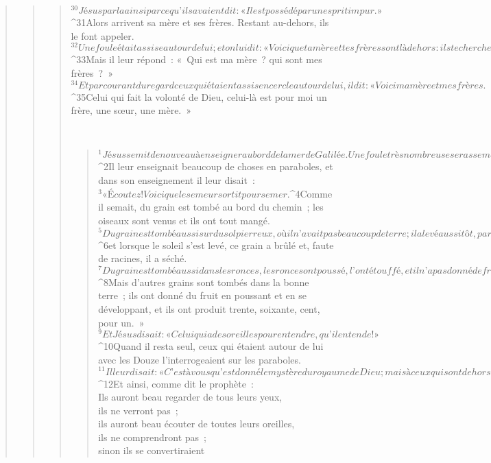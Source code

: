 \begin{verse}
\begin{verse}
\begin{verse}
${}^{30}Jésus parla ainsi parce qu’ils avaient dit : « Il est possédé par un esprit impur. »
${}^{31}Alors arrivent sa mère et ses frères. Restant au-dehors, ils le font appeler. 
${}^{32}Une foule était assise autour de lui ; et on lui dit : « Voici que ta mère et tes frères sont là dehors : ils te cherchent. » 
${}^{33}Mais il leur répond : « Qui est ma mère ? qui sont mes frères ? » 
${}^{34}Et parcourant du regard ceux qui étaient assis en cercle autour de lui, il dit : « Voici ma mère et mes frères. 
${}^{35}Celui qui fait la volonté de Dieu, celui-là est pour moi un frère, une sœur, une mère. »
      
         
      \bchapter{}
      \begin{verse}
${}^{1}Jésus se mit de nouveau à enseigner au bord de la mer de Galilée. Une foule très nombreuse se rassembla auprès de lui, si bien qu’il monta dans une barque où il s’assit. Il était sur la mer, et toute la foule était près de la mer, sur le rivage. 
${}^{2}Il leur enseignait beaucoup de choses en paraboles, et dans son enseignement il leur disait :
${}^{3}« Écoutez ! Voici que le semeur sortit pour semer. 
${}^{4}Comme il semait, du grain est tombé au bord du chemin ; les oiseaux sont venus et ils ont tout mangé. 
${}^{5}Du grain est tombé aussi sur du sol pierreux, où il n’avait pas beaucoup de terre ; il a levé aussitôt, parce que la terre était peu profonde ; 
${}^{6}et lorsque le soleil s’est levé, ce grain a brûlé et, faute de racines, il a séché. 
${}^{7}Du grain est tombé aussi dans les ronces, les ronces ont poussé, l’ont étouffé, et il n’a pas donné de fruit. 
${}^{8}Mais d’autres grains sont tombés dans la bonne terre ; ils ont donné du fruit en poussant et en se développant, et ils ont produit trente, soixante, cent, pour un. » 
${}^{9}Et Jésus disait : « Celui qui a des oreilles pour entendre, qu’il entende ! »
${}^{10}Quand il resta seul, ceux qui étaient autour de lui avec les Douze l’interrogeaient sur les paraboles. 
${}^{11}Il leur disait : « C’est à vous qu’est donné le mystère du royaume de Dieu ; mais à ceux qui sont dehors, tout se présente sous forme de paraboles. 
${}^{12}Et ainsi, comme dit le prophète :
        \\Ils auront beau regarder de tous leurs yeux,
        \\ils ne verront pas ;
        \\ils auront beau écouter de toutes leurs oreilles,
        \\ils ne comprendront pas ;
        \\sinon ils se convertiraient

\end{verse}
\end{verse}
\end{verse}
\end{verse}
